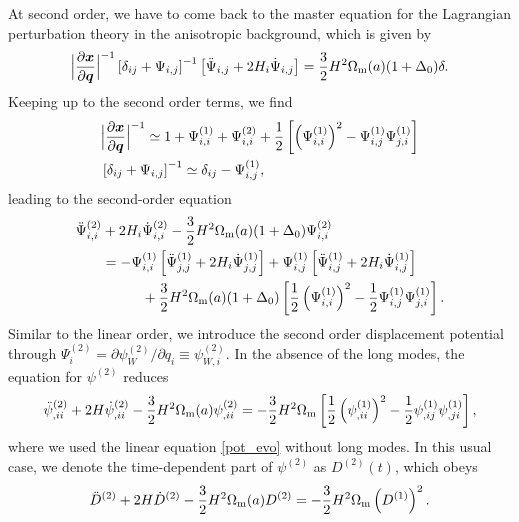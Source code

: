 \documentclass[a4paper,11pt]{article}
\newcommand{\vx}{{\bm x}}
\newcommand{\vq}{{\bm q}}
\begin{document}
At second order, we have to come back to the master equation for the Lagrangian perturbation theory
in the anisotropic background, which is given by
\begin{align}
    \Bigl| \frac{\partial\vx}{\partial\vq} \Bigr|^{-1}
    \left[ \delta_{ij} + \Psi_{i,j} \right]^{-1}
    \left[ \ddot{\Psi}_{i,j} + 2H_i\dot{\Psi}_{i,j} \right]
    =\frac32 H^2\Omega_{\rm m}(a)(1+\Delta_0)\delta.
\end{align}
Keeping up to the second order terms, we find
\begin{align}
&\Bigl| \frac{\partial\vx}{\partial\vq} \Bigr|^{-1}  \simeq
    1 + \Psi_{i,i}^{(1)} + \Psi_{i,i}^{(2)} + \frac12 \left[\left(\Psi_{i,i}^{(1)} \right)^2 - \Psi_{i,j}^{(1)}\Psi_{j,i}^{(1)} \right]
    \\
&\left[ \delta_{ij} + \Psi_{i,j} \right]^{-1} \simeq \delta_{ij} - \Psi_{i,j}^{(1)},
\end{align}
leading to the second-order equation
\begin{align}
\ddot \Psi^{(2)}_{i,i} &+ 2H_i\dot \Psi^{(2)}_{i,i} -\frac32 H^2\Omega_{\rm m}(a)(1+\Delta_0)\Psi_{i,i}^{(2)}
    \nonumber\\
    &= -\Psi_{i,i}^{(1)}\left[\ddot \Psi^{(1)}_{j,j} + 2H_i\dot \Psi_{j,j}^{(1)} \right]
    + \Psi_{i,j}^{(1)}\left[\ddot \Psi^{(1)}_{i,j} + 2H_i\dot \Psi_{i,j}^{(1)} \right]
    \nonumber\\
    &\hspace{1cm}+ \frac32 H^2 \Omega_{\rm m}(a) (1+\Delta_0) 
    \left[\frac12\left(\Psi_{i,i}^{(1)}\right)^2 - \frac12\Psi_{i,j}^{(1)}\Psi_{j,i}^{(1)}  \right].
\end{align}
Similar to the linear order, we introduce the second order displacement potential
through $\Psi_i^{(2)} = \partial\psi_W^{(2)}/\partial q_i \equiv \psi^{(2)}_{W,i}$.
In the absence of the long modes, the equation for $\psi^{(2)}$ reduces
\begin{align}
\ddot \psi^{(2)}_{,ii} + 2H\dot \psi^{(2)}_{,ii}-\frac32 H^2 \Omega_{\rm m}(a)\psi^{(2)}_{,ii}
 = -\frac32 H^2 \Omega_{\rm m}\left[\frac12 \left( \psi^{(1)}_{,ii} \right)^2 -\frac12 \psi^{(1)}_{,ij}\psi^{(1)}_{,ji} \right],
\end{align}
where we used the linear equation \eqref{pot_evo} without long modes.
In this usual case, we denote the time-dependent part of $\psi^{(2)}$ as $D^{(2)}(t)$, which obeys
\begin{align}
\ddot D^{(2)} + 2H \dot D^{(2)} - \frac32 H^2 \Omega_{\rm m}(a) D^{(2)} = -\frac32 H^2 \Omega_{\rm m}\left( D^{(1)} \right)^2.
\end{align}
\end{document}
